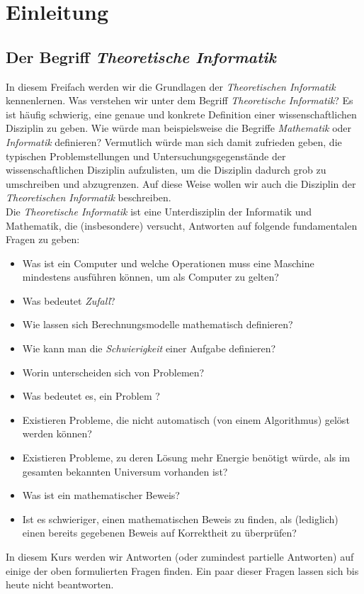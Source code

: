 \chapter{Einleitung}
\section{Der Begriff \textit{Theoretische Informatik}}
In diesem Freifach werden wir die Grundlagen der \textit{Theoretischen Informatik} kennenlernen. Was verstehen wir unter dem Begriff \textit{Theoretische Informatik}? Es ist häufig schwierig, eine genaue und konkrete Definition einer wissenschaftlichen Disziplin zu geben. Wie würde man beispielsweise die Begriffe \textit{Mathematik} oder \textit{Informatik} definieren? Vermutlich würde man sich damit zufrieden geben, die typischen Problemstellungen und Untersuchungsgegenstände der wissenschaftlichen Disziplin aufzulisten, um die Disziplin dadurch grob zu umschreiben und abzugrenzen. Auf diese Weise wollen wir auch die Disziplin der \textit{Theoretischen Informatik} beschreiben.\\
Die \textit{Theoretische Informatik} ist eine Unterdisziplin der Informatik und Mathematik, die (insbesondere) versucht, Antworten auf folgende fundamentalen Fragen zu geben:
\begin{itemize}
	\item Was ist ein Computer und welche Operationen muss eine Maschine mindestens ausführen können, um als Computer zu gelten?
	\item Was bedeutet \textit{Zufall}?
	\item Wie lassen sich Berechnungsmodelle mathematisch definieren?
	\item Wie kann man die \textit{Schwierigkeit} einer Aufgabe definieren?
	\item Worin unterscheiden sich  von  Problemen?
	\item Was bedeutet es, ein Problem ?
	\item Existieren Probleme, die nicht automatisch (von einem Algorithmus) gelöst werden können?
	\item Existieren Probleme, zu deren Lösung mehr Energie benötigt würde, als im gesamten bekannten Universum vorhanden ist?
	\item Was ist ein mathematischer Beweis?
	\item Ist es schwieriger, einen mathematischen Beweis zu finden, als (lediglich) einen bereits gegebenen Beweis auf Korrektheit zu überprüfen?
\end{itemize}
In diesem Kurs werden wir Antworten (oder zumindest partielle Antworten) auf einige der oben formulierten Fragen finden. Ein paar dieser Fragen lassen sich bis heute nicht beantworten.
\clearpage


